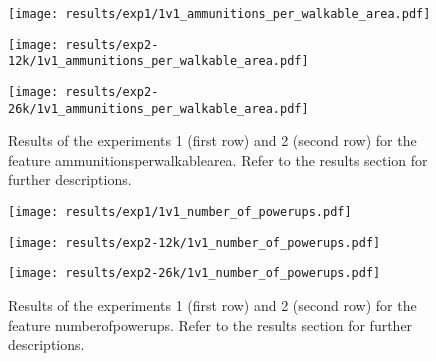 \begin{figure}[h!]
	\centering
	\begin{minipage}{0.4\linewidth}
		\texttt{[image: results/exp1/1v1\_ammunitions\_per\_walkable\_area.pdf]}
	\end{minipage}
	
	\begin{minipage}{0.4\linewidth}
		\texttt{[image: results/exp2-12k/1v1\_ammunitions\_per\_walkable\_area.pdf]}
	\end{minipage}
	\begin{minipage}{0.4\linewidth}
		\texttt{[image: results/exp2-26k/1v1\_ammunitions\_per\_walkable\_area.pdf]}
	\end{minipage}
	
	\caption[ Results: Feature ammunitions\textunderscore per\textunderscore walkable\textunderscore area]{ Results of the experiments 1 (first row) and 2 (second row) for the feature ammunitions\textunderscore per\textunderscore walkable\textunderscore area. Refer to the results section for further descriptions. }
	\label{fig:appendix_ammunitions_per_walkable_area}
\end{figure}

\begin{figure}[h!]
	\centering
	\begin{minipage}{0.4\linewidth}
		\texttt{[image: results/exp1/1v1\_number\_of\_powerups.pdf]}
	\end{minipage}
	
	\begin{minipage}{0.4\linewidth}
		\texttt{[image: results/exp2-12k/1v1\_number\_of\_powerups.pdf]}
	\end{minipage}
	\begin{minipage}{0.4\linewidth}
		\texttt{[image: results/exp2-26k/1v1\_number\_of\_powerups.pdf]}
	\end{minipage}
	
	\caption[ Results: Feature number\textunderscore of\textunderscore powerups]{ Results of the experiments 1 (first row) and 2 (second row) for the feature number\textunderscore of\textunderscore powerups. Refer to the results section for further descriptions. }
	\label{fig:appendix_number_of_powerups}
\end{figure}
\newpage 


